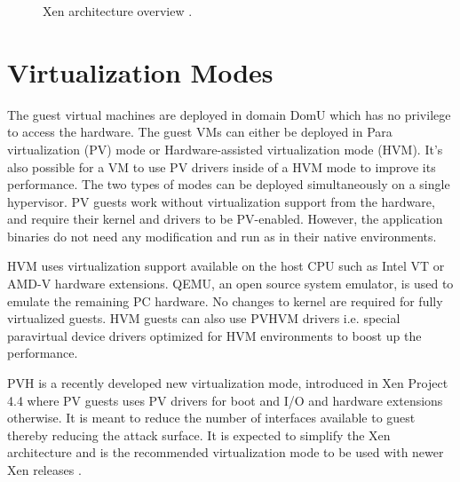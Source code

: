 \documentclass[9pt,twocolumn,twoside]{../../styles/osajnl}
\begin{document}
\begin{figure}[htbp]
	\centering
	\caption{Xen architecture overview \cite{www-xen-arch-diag}.}
	\label{fig:xen-arch}
\end{figure}

\section{Virtualization Modes}

The guest virtual machines are deployed in domain DomU which has no privilege to access the hardware. The guest VMs can either be deployed in Para virtualization (PV) mode or Hardware-assisted virtualization mode (HVM). It's also possible for a VM to use PV drivers inside of a HVM mode to improve its performance. The two types of modes can be deployed simultaneously  on a single hypervisor. PV guests work without virtualization support from the hardware, and require their kernel and drivers to be PV-enabled. However, the application binaries do not need any modification and run as in their native environments.  

HVM uses virtualization support available on the host CPU such as Intel VT or AMD-V hardware extensions. QEMU, an open source system emulator, is used to emulate the remaining PC hardware. No changes to kernel are required for fully virtualized guests. HVM guests can also use PVHVM drivers i.e. special  paravirtual device drivers optimized for HVM environments to boost up the performance. 

PVH is a recently developed new virtualization mode, introduced in Xen Project 4.4 where  PV guests uses PV drivers for boot and I/O and hardware extensions otherwise. It is meant to reduce the number of interfaces available to guest thereby reducing the attack surface. It is expected to simplify the Xen architecture and is the recommended virtualization mode to be used with newer Xen releases \cite{www-xen-pvh}. 
\end{document}

